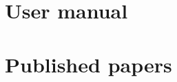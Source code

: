 \documentclass[a4paper, 12pt]{book}
\begin{document}
\cleardoublepage
\appendix
\chapter{User manual}
\label{app:manual}

\chapter{Published papers}
\label{app:papers}

\cleardoublepage


\end{document}
